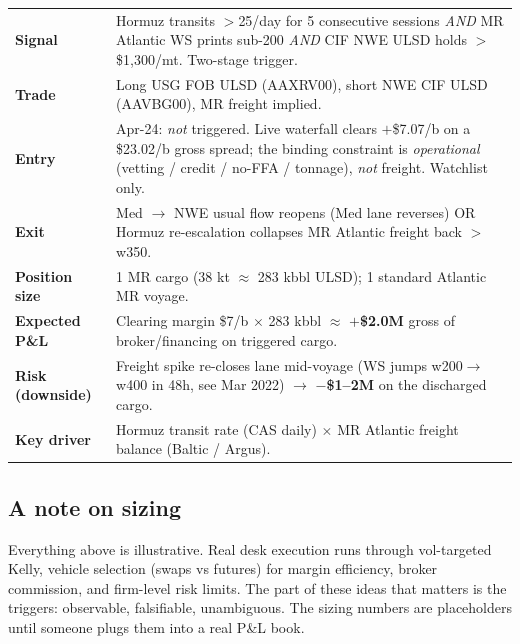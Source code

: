 \documentclass[10pt,a4paper]{article}
\begin{document}
\begin{redbox}
\setlength{\tabcolsep}{4pt}
\renewcommand{\arraystretch}{1.15}
\begin{tabular}{@{}p{}p{}@{}}
\textbf{Signal}            & Hormuz transits $>$25/day for 5 consecutive sessions \emph{AND} MR Atlantic WS prints sub-200 \emph{AND} CIF \mbox{NWE} ULSD holds $>$\$1,300/mt. Two-stage trigger. \\
\textbf{Trade}             & Long USG FOB ULSD (AAXRV00), short \mbox{NWE} CIF ULSD (AAVBG00), MR freight implied. \\
\textbf{Entry}             & Apr-24: \emph{not} triggered. Live waterfall clears $+$\$7.07/b on a \$23.02/b gross spread; the binding constraint is \emph{operational} (vetting / credit / no-FFA / tonnage), \emph{not} freight. Watchlist only. \\
\textbf{Exit}              & Med $\rightarrow$ \mbox{NWE} usual flow reopens (Med lane reverses) OR Hormuz re-escalation collapses MR Atlantic freight back $>$w350. \\
\textbf{Position size}     & 1 MR cargo (38 kt $\approx$ 283 kbbl ULSD); 1 standard Atlantic MR voyage. \\
\textbf{Expected P\&L}     & Clearing margin \$7/b $\times$ 283 kbbl $\approx$ \textbf{$+$\$2.0M} gross of broker/financing on triggered cargo. \\
\textbf{Risk (downside)}   & Freight spike re-closes lane mid-voyage (WS jumps w200$\rightarrow$w400 in 48h, see Mar 2022) $\rightarrow$ \textbf{$-$\$1--2M} on the discharged cargo. \\
\textbf{Key driver}        & Hormuz transit rate (CAS daily) $\times$ MR Atlantic freight balance (Baltic / Argus). \\
\end{tabular}
\end{redbox}

\subsection{A note on sizing}

Everything above is illustrative. Real desk execution runs through vol-targeted Kelly, vehicle selection (swaps vs futures) for margin efficiency, broker commission, and firm-level risk limits. The part of these ideas that matters is the triggers: observable, falsifiable, unambiguous. The sizing numbers are placeholders until someone plugs them into a real P\&L book.
\end{document}
